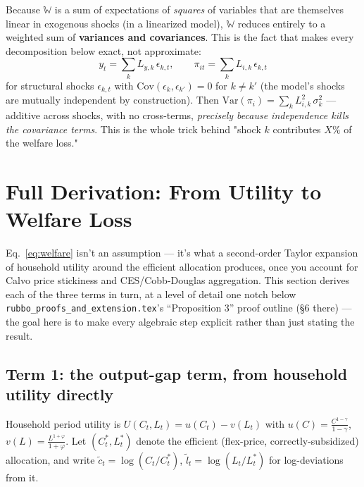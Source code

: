 \documentclass[12pt]{article}
\begin{document}
Because $\mathbb{W}$ is a sum of expectations of \emph{squares} of variables that are themselves
linear in exogenous shocks (in a linearized model), $\mathbb{W}$ reduces entirely to a weighted sum
of \textbf{variances and covariances}. This is the fact that makes every decomposition below exact,
not approximate:
\begin{equation}
    y_t = \sum_k L_{y,k}\,\epsilon_{k,t}, \qquad \pi_{it} = \sum_k L_{i,k}\,\epsilon_{k,t}
    \label{eq:linear}
\end{equation}
for structural shocks $\epsilon_{k,t}$ with $\mathrm{Cov}(\epsilon_k,\epsilon_{k'})=0$ for
$k\neq k'$ (the model's shocks are mutually independent by construction). Then
$\mathrm{Var}(\pi_i) = \sum_k L_{i,k}^2\,\sigma_k^2$ — additive across shocks, with no
cross-terms, \emph{precisely because independence kills the covariance terms}. This is the whole
trick behind "shock $k$ contributes $X\%$ of the welfare loss."

\section{Full Derivation: From Utility to Welfare Loss}
\label{sec:derivation}

Eq.~\eqref{eq:welfare} isn't an assumption — it's what a second-order Taylor expansion of household
utility around the efficient allocation produces, once you account for Calvo price stickiness and
CES/Cobb-Douglas aggregation. This section derives each of the three terms in turn, at a level of
detail one notch below \texttt{rubbo\_proofs\_and\_extension.tex}'s ``Proposition 3'' proof outline
(\S6 there) — the goal here is to make every algebraic step explicit rather than just stating the
result.

\subsection{Term 1: the output-gap term, from household utility directly}

Household period utility is $U(C_t,L_t) = u(C_t) - v(L_t)$ with $u(C)=\frac{C^{1-\gamma}}{1-\gamma}$,
$v(L)=\frac{L^{1+\varphi}}{1+\varphi}$. Let $(C_t^*, L_t^*)$ denote the efficient (flex-price,
correctly-subsidized) allocation, and write $\tilde c_t = \log(C_t/C_t^*)$,
$\tilde l_t = \log(L_t/L_t^*)$ for log-deviations from it.
\end{document}
